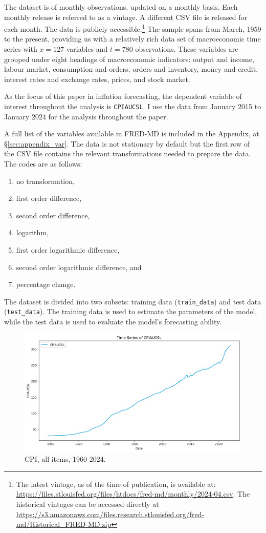 The dataset is of monthly observations, updated on a monthly basis. Each monthly release is referred to as a vintage. A different CSV file is released for each month. The data is publicly accessible.\footnote{The latest vintage, as of the time of publication, is available at: \url{https://files.stlouisfed.org/files/htdocs/fred-md/monthly/2024-04.csv}. The historical vintages can be accessed directly at \url{https://s3.amazonaws.com/files.research.stlouisfed.org/fred-md/Historical_FRED-MD.zip}
} The sample spans from March, 1959 to the present, providing us with a relatively rich data set of macroeconomic time series with $x = 127$ variables and $t = 780$ observations. These variables are grouped under eight headings of macroeconomic indicators: output and income, labour market, consumption and orders, orders and inventory, money and credit, interest rates and exchange rates, prices, and stock market.

As the focus of this paper in inflation forecasting, the dependent variable of interest throughout the analysis is \texttt{CPIAUCSL}. I use the data from January 2015 to January 2024 for the analysis throughout the paper.

A full list of the variables available in FRED-MD is included in the Appendix, at \S \ref{sec:appendix_var}. The data is not stationary by default but the first row of the CSV file contains the relevant transformations needed to prepare the data. The codes are as follows:

\begin{enumerate}
    \item no transformation,
    \item first order difference,
    \item second order difference,
    \item logarithm,
    \item first order logarithmic difference,
    \item second order logarithmic difference, and
    \item percentage change.
\end{enumerate}

The dataset is divided into two subsets: training data (\texttt{train\_data}) and test data (\texttt{test\_data}). The training data is used to estimate the parameters of the model, while the test data is used to evaluate the model's forecasting ability.

\begin{figure}[H]
    \centering
    \includegraphics[width=1\linewidth]{figures/cpi.png}
    \vspace{-30pt}
    \caption{CPI, all items, 1960-2024.}
    \label{fig:cpi} 
\end{figure}
